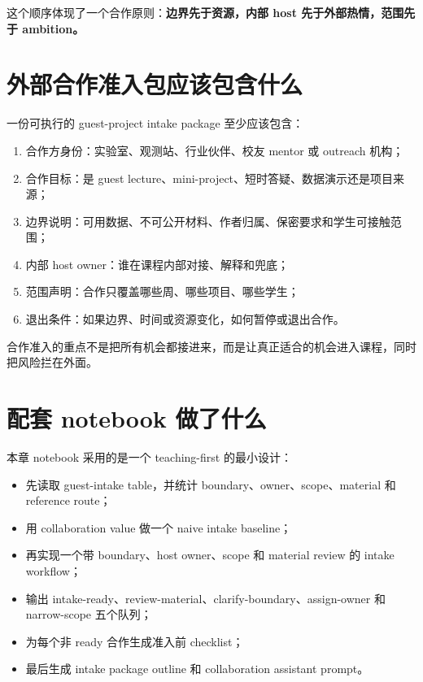 这个顺序体现了一个合作原则：\textbf{边界先于资源，内部 host 先于外部热情，范围先于 ambition。}

\section{外部合作准入包应该包含什么}

一份可执行的 guest-project intake package 至少应该包含：

\begin{enumerate}
    \item 合作方身份：实验室、观测站、行业伙伴、校友 mentor 或 outreach 机构；
    \item 合作目标：是 guest lecture、mini-project、短时答疑、数据演示还是项目来源；
    \item 边界说明：可用数据、不可公开材料、作者归属、保密要求和学生可接触范围；
    \item 内部 host owner：谁在课程内部对接、解释和兜底；
    \item 范围声明：合作只覆盖哪些周、哪些项目、哪些学生；
    \item 退出条件：如果边界、时间或资源变化，如何暂停或退出合作。
\end{enumerate}

合作准入的重点不是把所有机会都接进来，而是让真正适合的机会进入课程，同时把风险拦在外面。

\section{配套 notebook 做了什么}

本章 notebook 采用的是一个 teaching-first 的最小设计：

\begin{itemize}
    \item 先读取 guest-intake table，并统计 boundary、owner、scope、material 和 reference route；
    \item 用 collaboration value 做一个 naive intake baseline；
    \item 再实现一个带 boundary、host owner、scope 和 material review 的 intake workflow；
    \item 输出 intake-ready、review-material、clarify-boundary、assign-owner 和 narrow-scope 五个队列；
    \item 为每个非 ready 合作生成准入前 checklist；
    \item 最后生成 intake package outline 和 collaboration assistant prompt。
\end{itemize}

